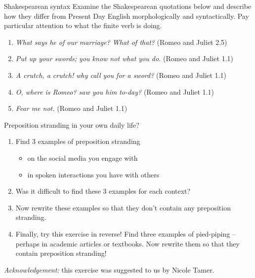 \begin{exercises}{Shakespearean syntax}\label{exercise-shakespeare-syntax}
Examine the Shakespearean quotations below and describe how they differ from Present Day English morphologically and syntactically. Pay particular attention to what the finite verb is doing.

\begin{enumerate}
    \item \emph{What says he of our marriage? What of that?} (Romeo and Juliet 2.5)
    \item \emph{Put up your swords; you know not what you do.} (Romeo and Juliet 1.1)
    \item \emph{A crutch, a crutch! why call you for a sword?} (Romeo and Juliet 1.1)
    \item \emph{O, where is Romeo? saw you him to-day?} (Romeo and Juliet 1.1)
    \item \emph{Fear me not.} (Romeo and Juliet 1.1)
\end{enumerate}

\end{exercises}

\begin{exercises}{Preposition stranding in your own daily life?}

\begin{enumerate}
    \item Find 3 examples of preposition stranding
    \begin{itemize}
        \item on the social media you engage with
        \item in spoken interactions you have with others
    \end{itemize}
    \item Was it difficult to find these 3 examples for each context?
    \item Now rewrite these examples so that they don't contain any preposition stranding.
    \item Finally, try this exercise in reverse! Find three examples of pied-piping -- perhaps in academic articles or textbooks. Now rewrite them so that they contain preposition stranding!
\end{enumerate}

\noindent\emph{Acknowledgement:} this exercise was suggested to us by Nicole Tamer.

\end{exercises}

